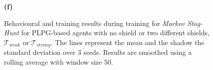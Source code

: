 \begin{figure}[h!]
\begin{minipage}[b]{0.32\textwidth}
        \textbf{(f)}
        \label{fig:msh_full_results:subfig6}
    \end{minipage}

    \caption[Results for \textit{Markov Stag-Hunt}.]{Behavioural and training results during training for \textit{Markov Stag-Hunt} for PLPG-based agents with no shield or two different shields, $\mathcal{T}_{weak}$ or $\mathcal{T}_{strong}$. The lines represent the mean and the shadow the standard deviation over 3 seeds. Results are smoothed using a rolling average with window size 50.}
    \label{fig:msh_full_results}
\end{figure}